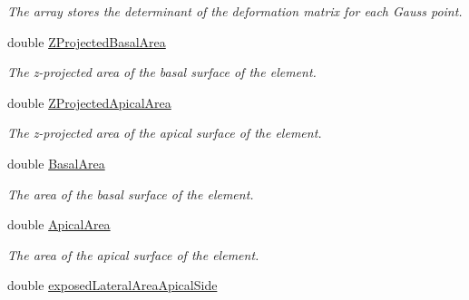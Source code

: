 \begin{DoxyCompactItemize}
\begin{DoxyCompactList}\small\item\em The array stores the determinant of the deformation matrix for each Gauss point. \end{DoxyCompactList}\item 
\hypertarget{classShapeBase_a51a8101057e2771172a4716c128705d7}{}double \hyperlink{classShapeBase_a51a8101057e2771172a4716c128705d7}{Z\+Projected\+Basal\+Area}\label{classShapeBase_a51a8101057e2771172a4716c128705d7}

\begin{DoxyCompactList}\small\item\em The z-\/projected area of the basal surface of the element. \end{DoxyCompactList}\item 
\hypertarget{classShapeBase_aa7043ddacbcd92480cb54467a2777627}{}double \hyperlink{classShapeBase_aa7043ddacbcd92480cb54467a2777627}{Z\+Projected\+Apical\+Area}\label{classShapeBase_aa7043ddacbcd92480cb54467a2777627}

\begin{DoxyCompactList}\small\item\em The z-\/projected area of the apical surface of the element. \end{DoxyCompactList}\item 
\hypertarget{classShapeBase_a2ae2b0b1dfd0672a39897e780d861254}{}double \hyperlink{classShapeBase_a2ae2b0b1dfd0672a39897e780d861254}{Basal\+Area}\label{classShapeBase_a2ae2b0b1dfd0672a39897e780d861254}

\begin{DoxyCompactList}\small\item\em The area of the basal surface of the element. \end{DoxyCompactList}\item 
\hypertarget{classShapeBase_adb4227c13db7e34dd1af182d143af47b}{}double \hyperlink{classShapeBase_adb4227c13db7e34dd1af182d143af47b}{Apical\+Area}\label{classShapeBase_adb4227c13db7e34dd1af182d143af47b}

\begin{DoxyCompactList}\small\item\em The area of the apical surface of the element. \end{DoxyCompactList}\item 
\hypertarget{classShapeBase_ac29dcfc319798bd21b3bc2b50ac401c8}{}double \hyperlink{classShapeBase_ac29dcfc319798bd21b3bc2b50ac401c8}{exposed\+Lateral\+Area\+Apical\+Side}\label{classShapeBase_ac29dcfc319798bd21b3bc2b50ac401c8}


\end{DoxyCompactItemize}
